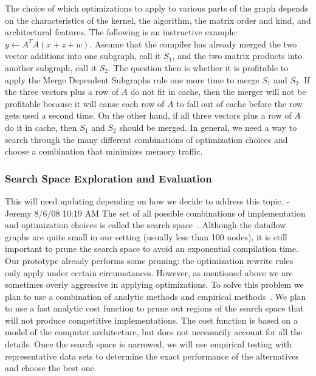 \documentclass[11pt]{article}
\begin{document}
The choice of which optimizations to apply to various parts of the graph depends on the characteristics of the kernel, the algorithm, the matrix order and kind, and architectural features.  The following is an instructive example: $y \gets A^T A (x + z + w)$.  Assume that the compiler has already merged the two vector additions into one subgraph, call it $S_1$, and the two matrix products into another subgraph, call it $S_2$. The question then is whether it is profitable to apply the Merge Dependent Subgraphs rule one more time to merge $S_1$ and $S_2$. If the three vectors plus a row of $A$ do not fit in cache, then the merger will not be profitable because it will cause each row of $A$ to fall out of cache before the row gets used a second time.  On the other hand, if all three vectors plus a row of $A$ do it in cache, then $S_1$ and $S_2$ should be merged.  In general, we need a way to search through the many different combinations of optimization choices and choose a combination that minimizes memory traffic.

\subsubsection{Search Space Exploration and Evaluation}
\label{sec:search}

This will need updating depending on how we decide to address this topic. -Jeremy 8/6/08 10:19 AM 
The set of all possible combinations of implementation and optimization choices is called the search space~\cite{Kisuki:2000uq,Triantafyllis:2003uq, Cooper:2005kx}.  Although the dataflow graphs are quite small in our setting (usually less than 100 nodes), it is still important to prune the search space to avoid an exponential compilation time. Our prototype already performs some pruning: the optimization rewrite rules only apply under certain circumstances.  However, as mentioned above we are sometimes overly aggressive in applying optimizations. To solve this problem we plan to use a combination of analytic methods and empirical
methods~\cite{Chen:2007vn}.
We plan to use a fast analytic cost function to prune out regions of the search space that will not produce competitive implementations. The cost function is based on a model of the computer architecture, but does not necessarily account for all the details.  Once the search space is narrowed, we will use empirical testing with representative data sets to determine the exact performance of the alternatives and choose the best one.
\end{document}
